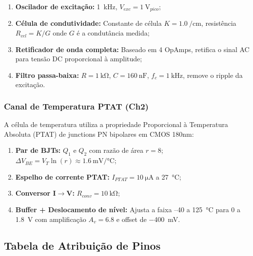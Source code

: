 \documentclass[12pt,a4paper]{article}
\begin{document}
\begin{enumerate}
  \item \textbf{Oscilador de excitação:} \SI{1}{\kilo\hertz}, $V_{exc} = \SI{1}{\volt}_{pico}$;
  \item \textbf{Célula de condutividade:} Constante de célula $K = \SI{1.0}{\per\centi\meter}$,
        resistência $R_{cel} = K/G$ onde $G$ é a condutância medida;
  \item \textbf{Retificador de onda completa:} Baseado em 4 OpAmps, retifica o
        sinal AC para tensão DC proporcional à amplitude;
  \item \textbf{Filtro passa-baixa:} $R = \SI{1}{\kilo\ohm}$, $C = \SI{160}{\nano\farad}$,
        $f_c = \SI{1}{\kilo\hertz}$, remove o ripple da excitação.
\end{enumerate}

\subsubsection{Canal de Temperatura PTAT (Ch2)}

A célula de temperatura utiliza a propriedade Proporcional à Temperatura Absoluta
(PTAT) de junctions PN bipolares em CMOS 180nm:

\begin{enumerate}
  \item \textbf{Par de BJTs:} $Q_1$ e $Q_2$ com razão de área $r = 8$;
        $\Delta V_{BE} = V_T \ln(r) \approx \SI{1.6}{\milli\volt\per\celsius}$;
  \item \textbf{Espelho de corrente PTAT:} $I_{PTAT} = \SI{10}{\micro\ampere}$
        a \SI{27}{\celsius};
  \item \textbf{Conversor I$\to$V:} $R_{conv} = \SI{10}{\kilo\ohm}$;
  \item \textbf{Buffer + Deslocamento de nível:} Ajusta a faixa --40 a \SI{125}{\celsius}
        para 0 a \SI{1.8}{\volt} com amplificação $A_v = 6.8$ e offset de \SI{-400}{\milli\volt}.
\end{enumerate}

\subsection{Tabela de Atribuição de Pinos}
\end{document}
